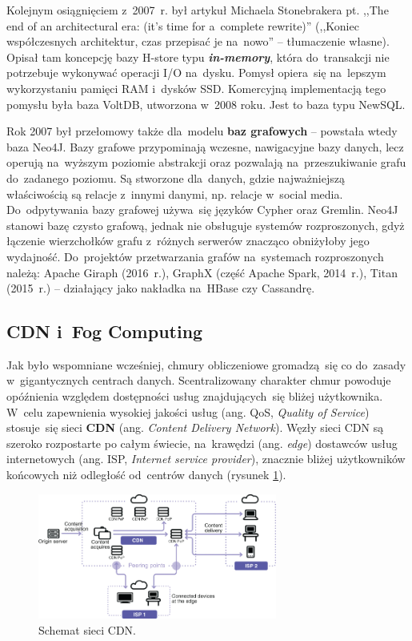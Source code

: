 \documentclass[12pt,a4paper,twoside,titlepage,openright]{book}
\begin{document}
Kolejnym osiągnięciem z~2007~r. był artykuł Michaela Stonebrakera pt. ,,The end of an architectural era: (it's time for a~complete rewrite)'' (,,Koniec współczesnych architektur, czas przepisać je na~nowo'' -- tłumaczenie własne). Opisał tam koncepcję bazy H-store typu \textit{\textbf{in-memory}}, która do~transakcji nie potrzebuje wykonywać operacji I/O na~dysku. Pomysł opiera~się na~lepszym wykorzystaniu pamięci RAM i~dysków SSD. Komercyjną implementacją tego pomysłu była baza VoltDB, utworzona w~2008 roku. Jest to baza typu NewSQL.

Rok 2007 był przełomowy także dla~modelu \textbf{baz grafowych} -- powstała wtedy baza Neo4J. Bazy grafowe przypominają wczesne, nawigacyjne bazy danych, lecz operują na~wyższym poziomie abstrakcji oraz pozwalają na~przeszukiwanie grafu do~zadanego poziomu. Są stworzone dla~danych, gdzie najważniejszą właściwością są relacje z~innymi danymi, np. relacje w~social media. Do~odpytywania bazy grafowej używa~się języków Cypher oraz Gremlin. Neo4J stanowi bazę czysto grafową, jednak nie obsługuje systemów rozproszonych, gdyż łączenie wierzchołków grafu z~różnych serwerów znacząco obniżyłoby jego wydajność. Do~projektów przetwarzania grafów na~systemach rozproszonych należą: Apache Giraph (2016~r.), GraphX (część Apache Spark, 2014~r.), Titan (2015~r.) -- działający jako nakładka na~HBase czy Cassandrę.


\subsection{CDN i~Fog Computing} \label{section:fog}

Jak było wspomniane wcześniej, chmury obliczeniowe gromadzą~się co do~zasady w~gigantycznych centrach danych. Scentralizowany charakter chmur powoduje opóźnienia względem dostępności usług znajdujących~się bliżej użytkownika. W~celu zapewnienia wysokiej jakości usług (ang. QoS, \textit{Quality of Service}) stosuje~się sieci \textbf{CDN} (ang. \textit{Content Delivery Network}). Węzły sieci CDN są szeroko rozpostarte po całym świecie, na~krawędzi (ang. \textit{edge}) dostawców usług internetowych (ang. ISP, \textit{Internet service provider}), znacznie bliżej użytkowników końcowych niż odległość od~centrów danych (rysunek \ref{fig:cdn-schemat}). \cite{cdn}

\begin{figure}[h]
	\centering
			\includegraphics[width=0.7\textwidth]{cdn-schemat.jpg}
		\caption{Schemat sieci CDN. \cite{cdn}}
		\label{fig:cdn-schemat}
\end{figure}
\end{document}
